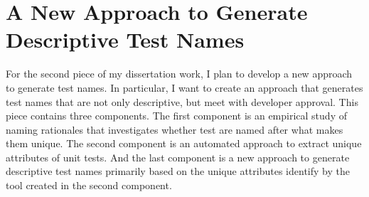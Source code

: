 \section{A New Approach to Generate Descriptive Test Names}
\label{sec:generate-names}

For the second piece of my dissertation work, I plan to develop a new approach to generate test names.
%
In particular, I want to create an approach that generates test names that are not only descriptive, but meet with developer approval.
%
This piece contains three components.
%
The first component is an empirical study of naming rationales that investigates whether test are named after what makes them unique.
%
The second component is an automated approach to extract unique attributes of unit tests.
%
And the last component is a new approach to generate descriptive test names primarily based on the unique attributes identify by the tool created in the second component.






